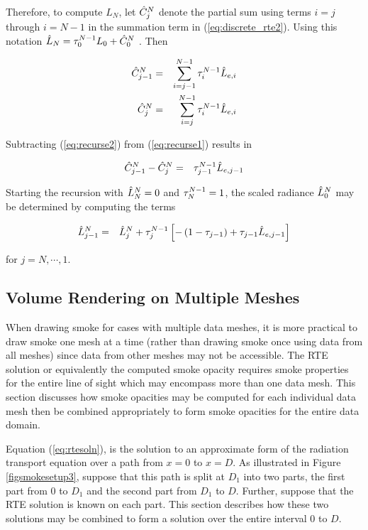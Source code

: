 Therefore, to compute $L_N$,
let $\hat{C}_{j}^N$ denote the partial sum using terms $i=j$ through $i=N-1$ in the summation term in (\ref{eq:discrete_rte2}).  Using this notation $\hat{L}_N=\tau_{0}^{N-1}L_0+\hat{C}_{0}^N$ . Then

\begin{eqnarray}
\label{eq:recurse1}
\hat{C}_{j-1}^N &= &\sum_{i=j-1}^{N-1}\tau_{i}^{N-1}\hat{L}_{e,i}\\
\label{eq:recurse2}
\hat{C}_{j}^N     &= &\sum_{i=j}^{N-1}  \tau_{i}^{N-1}\hat{L}_{e,i}
\end{eqnarray}

Subtracting (\ref{eq:recurse2}) from (\ref{eq:recurse1}) results in

\begin{eqnarray*}
\hat{C}_{j-1}^N -\hat{C}_{j}^N&= &\tau_{j-1}^{N-1}\hat{L}_{e,j-1}
\end{eqnarray*}

Starting the recursion with 
$\hat{L}_{N}^N=0$ and $\tau_{N}^{N-1}=1$, the scaled radiance $\hat{L}_{0}^N$ may be determined by computing the terms

\begin{eqnarray}
\hat{L}_{j-1}^N &= &\hat{L}_{j}^N+\tau_{j}^{N-1}\left[-\left(1-\tau_{j-1}\right) + \tau_{j-1}\hat{L}_{e,j-1}\right]
\end{eqnarray}

for $j=N,\cdots,1$.

%
%

\subsection{Volume Rendering on Multiple Meshes}
When drawing smoke for cases with multiple data meshes, it is more practical to draw smoke one mesh at a time (rather than drawing smoke once using data from all meshes) since data from other meshes may not be accessible.  The RTE solution or equivalently the computed smoke opacity requires smoke properties for the entire line of sight which may encompass more than one data mesh.  This section discusses how smoke opacities may be computed for each individual data mesh then be combined appropriately to form smoke opacities for the entire data domain.

Equation (\ref{eq:rtesoln}), is the solution to an approximate form of the radiation transport equation over a path from $x=0$ to $x=D$.  As illustrated in Figure \ref{figsmokesetup3}, suppose that this path is split at $D_1$ into two parts, the first part from $0$ to $D_1$ and the second part from $D_1$ to $D$. Further, suppose that the RTE solution is known on each part. This section describes how these two solutions may be combined to form a solution over the entire interval $0$ to $D$.

